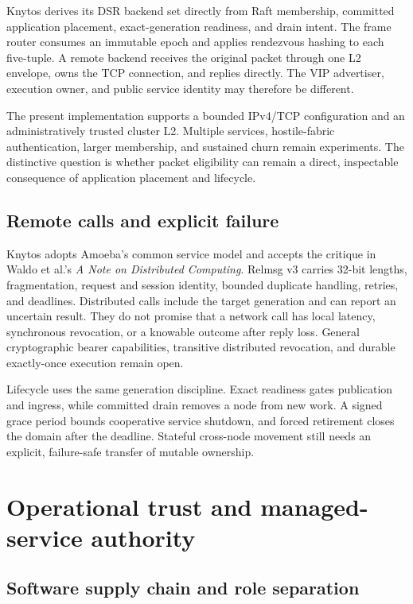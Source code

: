 Knytos derives its DSR backend set directly from Raft membership,
committed application placement, exact-generation readiness, and drain intent.
The frame router consumes an immutable epoch and applies rendezvous hashing to
each five-tuple. A remote backend receives the original packet through one L2
envelope, owns the TCP connection, and replies directly. The VIP advertiser,
execution owner, and public service identity may therefore be different.

The present implementation supports a bounded IPv4/TCP configuration and an
administratively trusted cluster L2. Multiple services, hostile-fabric
authentication, larger membership, and sustained churn remain experiments.
The distinctive question is whether packet eligibility can remain a direct,
inspectable consequence of application placement and lifecycle.

\subsection{Remote calls and explicit failure}

Knytos adopts Amoeba's common service model and accepts the critique in
Waldo et al.'s \emph{A Note on Distributed Computing}. Relmsg v3 carries
32-bit lengths, fragmentation, request and session identity, bounded duplicate
handling, retries, and deadlines. Distributed calls include the target
generation and can report an uncertain result. They do not promise that a
network call has local latency, synchronous revocation, or a knowable outcome
after reply loss. General cryptographic bearer capabilities, transitive
distributed revocation, and durable exactly-once execution remain open.

Lifecycle uses the same generation discipline. Exact readiness gates
publication and ingress, while committed drain removes a node from new work. A
signed grace period bounds cooperative service shutdown, and forced retirement
closes the domain after the deadline. Stateful cross-node movement still needs
an explicit, failure-safe transfer of mutable ownership.

\section{Operational trust and managed-service authority}

\subsection{Software supply chain and role separation}

